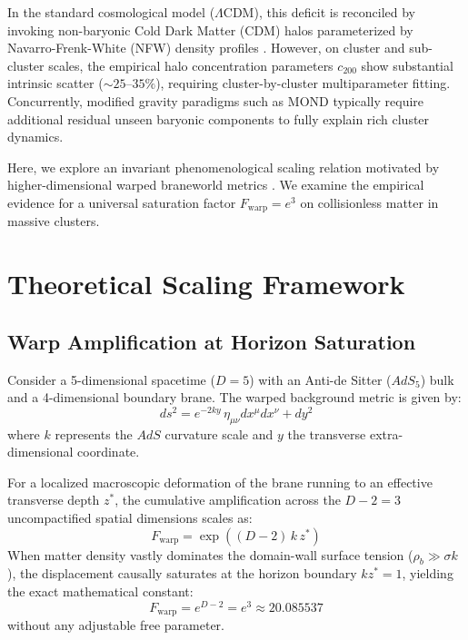 \documentclass[10pt,twocolumn]{article}
\begin{document}
In the standard cosmological model ($\Lambda\text{CDM}$), this deficit is reconciled by invoking non-baryonic Cold Dark Matter (CDM) halos parameterized by Navarro-Frenk-White (NFW) density profiles \cite{navarro1997}. However, on cluster and sub-cluster scales, the empirical halo concentration parameters $c_{200}$ show substantial intrinsic scatter ($\sim 25\text{--}35\%$), requiring cluster-by-cluster multiparameter fitting. Concurrently, modified gravity paradigms such as MOND \cite{milgrom1983} typically require additional residual unseen baryonic components to fully explain rich cluster dynamics.

Here, we explore an invariant phenomenological scaling relation motivated by higher-dimensional warped braneworld metrics \cite{randall1999}. We examine the empirical evidence for a universal saturation factor $F_{\text{warp}} = e^3$ on collisionless matter in massive clusters.

\section{Theoretical Scaling Framework}

\subsection{Warp Amplification at Horizon Saturation}

Consider a 5-dimensional spacetime ($D=5$) with an Anti-de Sitter ($AdS_5$) bulk and a 4-dimensional boundary brane. The warped background metric is given by:
\begin{equation}
    ds^2 = e^{-2ky}\,\eta_{\mu\nu}dx^\mu dx^\nu + dy^2
\end{equation}
where $k$ represents the $AdS$ curvature scale and $y$ the transverse extra-dimensional coordinate.

For a localized macroscopic deformation of the brane running to an effective transverse depth $z^*$, the cumulative amplification across the $D-2 = 3$ uncompactified spatial dimensions scales as:
\begin{equation}
    F_{\text{warp}} = \exp\left((D-2)\,k\,z^*\right)
\end{equation}
When matter density vastly dominates the domain-wall surface tension ($\rho_b \gg \sigma k$), the displacement causally saturates at the horizon boundary $k z^* = 1$, yielding the exact mathematical constant:
\begin{equation}
    F_{\text{warp}} = e^{D-2} = e^3 \approx 20.085537
\end{equation}
without any adjustable free parameter.
\end{document}
